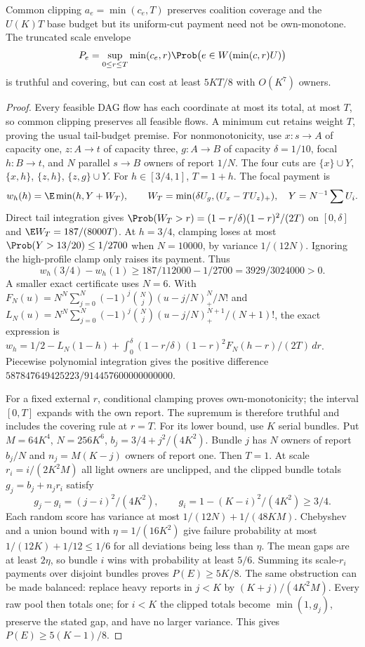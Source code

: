 \begin{proposition}\label{noise:scales}
Common clipping $a_e=\min(c_e,T)$ preserves coalition coverage and the
$U(K)T$ base budget but its uniform-cut payment need not be own-monotone.
The truncated scale envelope
\[
 P_e=\sup_{0\le r\le T}\min(c_e,r)
       \Prob\bigl(e\in W(\min(c,r)U)\bigr)
\]
is truthful and covering, but can cost at least $5KT/8$ with $O(K^7)$ owners.
\end{proposition}
\begin{proof}
Every feasible DAG flow has each coordinate at most its total, at most $T$,
so common clipping preserves all feasible flows. A minimum cut retains
weight $T$, proving the usual tail-budget premise.
For nonmonotonicity, use $x:s\to A$ of capacity one, $z:A\to t$ of
capacity three, $g:A\to B$ of capacity $\delta=1/10$, focal $h:B\to t$,
and $N$ parallel $s\to B$ owners of report $1/N$.
The four cuts are $\{x\}\cup Y$, $\{x,h\}$, $\{z,h\}$,
$\{z,g\}\cup Y$. For $h\in[3/4,1]$, $T=1+h$.
The focal payment is
\[
 w_h(h)=\E\min(h,Y+W_T),\qquad
 W_T=\min(\delta U_g,(U_x-TU_z)_+),\quad
 Y=N^{-1}\sum U_i.
\]
Direct tail integration gives
$\Prob(W_T>r)=(1-r/\delta)(1-r)^2/(2T)$ on $[0,\delta]$ and
$\E W_T=187/(8000T)$. At $h=3/4$, clamping loses at most
$\Prob(Y>13/20)\le1/2700$ when $N=10000$, by variance $1/(12N)$.
Ignoring the high-profile clamp only raises its payment. Thus
\[
 w_h(3/4)-w_h(1)\ge187/112000-1/2700=3929/3024000>0.
\]
A smaller exact certificate uses $N=6$. With
$F_N(u)=N^N\sum_{j=0}^N(-1)^j\binom Nj(u-j/N)_+^N/N!$ and
$L_N(u)=N^N\sum_{j=0}^N(-1)^j\binom Nj(u-j/N)_+^{N+1}/(N+1)!$,
the exact expression is
$w_h=1/2-L_N(1-h)+\int_0^\delta
(1-r/\delta)(1-r)^2F_N(h-r)/(2T)\,dr$.
Piecewise polynomial integration gives the positive difference
$587847649425223/914457600000000000$.

For a fixed external $r$, conditional clamping proves own-monotonicity;
the interval $[0,T]$ expands with the own report. The supremum is therefore
truthful and includes the covering rule at $r=T$.
For its lower bound, use $K$ serial bundles. Put $M=64K^4$, $N=256K^6$,
$b_j=3/4+j^2/(4K^2)$. Bundle $j$ has $N$ owners of report $b_j/N$ and
$n_j=M(K-j)$ owners of report one. Then $T=1$.
At scale $r_i=i/(2K^2M)$ all light owners are unclipped, and the clipped
bundle totals $g_j=b_j+n_jr_i$ satisfy
\[
 g_j-g_i=(j-i)^2/(4K^2),\qquad g_i=1-(K-i)^2/(4K^2)\ge3/4.
\]
Each random score has variance at most $1/(12N)+1/(48KM)$.
Chebyshev and a union bound with $\eta=1/(16K^2)$ give failure probability
at most $1/(12K)+1/12\le1/6$ for all deviations being less than $\eta$.
The mean gaps are at least $2\eta$, so bundle $i$ wins with probability
at least $5/6$. Summing its scale-$r_i$ payments over disjoint bundles
proves $P(E)\ge5K/8$.
The same obstruction can be made balanced: replace heavy reports in
$j<K$ by $(K+j)/(4K^2M)$. Every raw pool then totals one; for $i<K$
the clipped totals become $\min(1,g_j)$, preserve the stated gap, and have
no larger variance. This gives $P(E)\ge5(K-1)/8$.
\end{proof}

